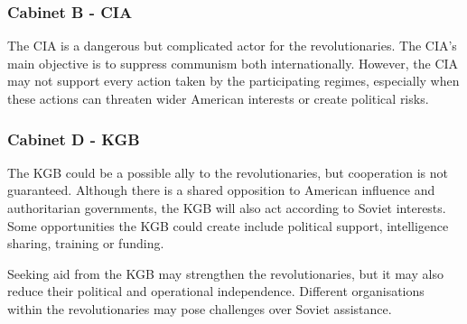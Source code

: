 \subsubsection{Cabinet B - CIA}

The CIA is a dangerous but complicated actor for the revolutionaries. The CIA’s main objective is to suppress communism both internationally. However, the CIA may not support every action taken by the participating regimes, especially when these actions can threaten wider American interests or create political risks.

\subsubsection{Cabinet D - KGB}

The KGB could be a possible ally to the revolutionaries, but cooperation is not guaranteed. Although there is a shared opposition to American influence and authoritarian governments, the KGB will also act according to Soviet interests. Some opportunities the KGB could create include political support, intelligence sharing, training or funding.

Seeking aid from the KGB may strengthen the revolutionaries, but it may also reduce their political and operational independence. Different organisations within the revolutionaries may pose challenges over Soviet assistance.
